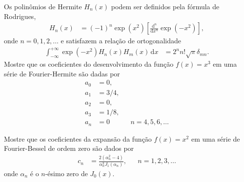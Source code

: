 \documentclass[a4paper,12pt, leqno, answers]{exam}
\begin{document}
\begin{questions}
    \question Os polin\^{o}mios de Hermite $H_n(x)$ podem ser definidos pela f\'{o}rmula de Rodrigues,
    \begin{align*}
        H_n(x) &= (-1)^n \exp(x^2) \left[ \frac{\mathrm{d}^n}{\mathrm{d}x^n} \exp(-x^2) \right],
    \end{align*}
    onde $n = 0, 1, 2, \ldots$ e satisfazem a relação de ortogonalidade
    \begin{align*}
        \int_{-\infty}^{+\infty} \exp(-x^2) H_n(x) H_m(x) \,\mathrm{d}x &= 2^n n! \sqrt{\pi} \delta_{mn}.
    \end{align*}
    Mostre que os coeficientes do desenvolvimento da função $f(x) = x^3$ em uma série de Fourier-Hermite são dadas por
    \begin{align*}
        a_0 &= 0, \\
        a_1 &= 3/4, \\
        a_2 &= 0, \\
        a_3 &= 1/8, \\
        a_n &= 0 && n = 4, 5, 6, \ldots
    \end{align*}
    \begin{solution}
    \end{solution}

    \question Mostre que os coeficientes da expansão da função $f(x) = x^2$ em uma série de Fourier-Bessel de ordem zero são dados por
    \begin{align*}
        c_n &= \frac{2 \left( \alpha_n^2 - 4 \right)}{\alpha_n^3 J_1(\alpha_n)}, && n = 1, 2, 3, \ldots
    \end{align*}
    onde $\alpha_n$ é o $n$-ésimo zero de $J_0(x)$.
    \begin{solution}
    \end{solution}

    \question
\end{questions}
\end{document}

